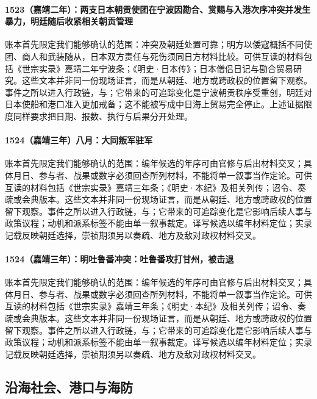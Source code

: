 \paragraph{1523（嘉靖二年）：两支日本朝贡使团在宁波因勘合、赏赐与入港次序冲突并发生暴力，明廷随后收紧相关朝贡管理} 账本首先限定我们能够确认的范围：冲突及朝廷处置可靠；明方以倭寇概括不同使团、商人和武装随从，日本双方责任与死伤须同日方材料比较。可供互读的材料包括《世宗实录》嘉靖二年宁波条；《明史·日本传》；日本僧侣日记与勘合贸易研究。这些文本并非同一份现场证言，而是从朝廷、地方或跨政权的位置留下观察。事件之所以进入行政链，与；它带来的可追踪变化是宁波朝贡秩序受重创，明廷对日本使船和港口准入更加戒备；这不能被写成中日海上贸易完全停止。上述证据限度同样要求把日期、报数、执行与后果分开处理。

\paragraph{1524（嘉靖三年）八月：大同叛军驻军} 账本首先限定我们能够确认的范围：编年候选的年序可由官修与后出材料交叉；具体月日、参与者、战果或数字必须回查所列材料，不能将单一叙事当作定论。可供互读的材料包括《世宗实录》嘉靖三年条；《明史·本纪》及相关列传；诏令、奏疏或会典版本。这些文本并非同一份现场证言，而是从朝廷、地方或跨政权的位置留下观察。事件之所以进入行政链，与；它带来的可追踪变化是它影响后续人事与政策议程；动机和派系标签不能由单一叙事裁定。译写候选以编年材料定位；实录记载反映朝廷选择，崇祯期须另以奏疏、地方及敌对政权材料交叉。

\paragraph{1524（嘉靖三年）：明吐鲁番冲突：吐鲁番攻打甘州，被击退} 账本首先限定我们能够确认的范围：编年候选的年序可由官修与后出材料交叉；具体月日、参与者、战果或数字必须回查所列材料，不能将单一叙事当作定论。可供互读的材料包括《世宗实录》嘉靖三年条；《明史·本纪》及相关列传；诏令、奏疏或会典版本。这些文本并非同一份现场证言，而是从朝廷、地方或跨政权的位置留下观察。事件之所以进入行政链，与；它带来的可追踪变化是它影响后续人事与政策议程；动机和派系标签不能由单一叙事裁定。译写候选以编年材料定位；实录记载反映朝廷选择，崇祯期须另以奏疏、地方及敌对政权材料交叉。

\subsection{沿海社会、港口与海防}

